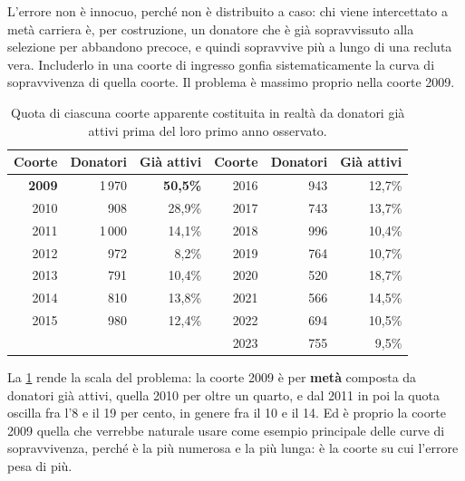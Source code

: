 L'errore non è innocuo, perché non è distribuito a caso: chi viene intercettato
a metà carriera è, per costruzione, un donatore che è già sopravvissuto alla
selezione per abbandono precoce, e quindi sopravvive più a lungo di una recluta
vera. Includerlo in una coorte di ingresso gonfia sistematicamente la curva di
sopravvivenza di quella coorte. Il problema è massimo proprio nella coorte
2009.

\begin{table}[ht]
\centering
\caption{Quota di ciascuna coorte apparente costituita in realtà da donatori
già attivi prima del loro primo anno osservato.}
\label{tab:coorti_composizione}
\begin{tabular}{@{}rrr@{\qquad}rrr@{}}
\toprule
\textbf{Coorte} & \textbf{Donatori} & \textbf{Già attivi} &
\textbf{Coorte} & \textbf{Donatori} & \textbf{Già attivi} \\
\midrule
\textbf{2009} & 1\,970 & \textbf{50{,}5\%} & 2016 & 943 & 12{,}7\% \\
2010 & \phantom{0}908 & 28{,}9\% & 2017 & 743 & 13{,}7\% \\
2011 & 1\,000 & 14{,}1\% & 2018 & 996 & 10{,}4\% \\
2012 & \phantom{0}972 & \phantom{0}8{,}2\% & 2019 & 764 & 10{,}7\% \\
2013 & \phantom{0}791 & 10{,}4\% & 2020 & 520 & 18{,}7\% \\
2014 & \phantom{0}810 & 13{,}8\% & 2021 & 566 & 14{,}5\% \\
2015 & \phantom{0}980 & 12{,}4\% & 2022 & 694 & 10{,}5\% \\
     &                &          & 2023 & 755 & \phantom{0}9{,}5\% \\
\bottomrule
\end{tabular}
\end{table}

La \cref{tab:coorti_composizione} rende la scala del problema: la coorte 2009 è
per \textbf{metà} composta da donatori già attivi, quella 2010 per oltre un
quarto, e dal 2011 in poi la quota oscilla fra l'8 e il 19 per cento, in
genere fra il 10 e il 14.
Ed è proprio la coorte 2009 quella che verrebbe naturale usare come esempio
principale delle curve di sopravvivenza, perché è la più numerosa e la più
lunga: è la coorte su cui l'errore pesa di più.


